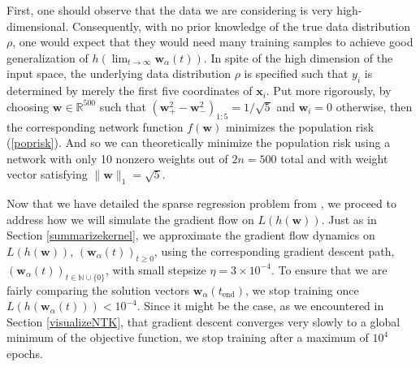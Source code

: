 \documentclass{article}
\begin{document}
First, one should observe that the data we are considering is very high-dimensional. Consequently, with no prior knowledge of the true data distribution $\rho$, one would expect that they would need many training samples to achieve good generalization of $h(\lim_{t \to \infty} \boldsymbol{w}_{\alpha}(t))$. In spite of the high dimension of the input space, the underlying data distribution $\rho$ is specified such that $y_i$ is determined by merely the first five coordinates of $\boldsymbol{x}_i$. Put more rigorously, by choosing  $\boldsymbol{w} \in \mathbb{R}^{500}$ such that $(\boldsymbol{w}_+^2 - \boldsymbol{w}_-^2)_{1:5} = 1/\sqrt{5}$ and $\boldsymbol{w}_i = 0$ otherwise, then the corresponding network function $f(\boldsymbol{w})$ minimizes the population risk (\ref{poprisk}). And so we can theoretically minimize the population risk using a network with only 10 nonzero weights out of $2n = 500$ total and with weight vector satisfying $\| \boldsymbol{w} \|_1 = \sqrt{5}$.

Now that we have detailed the sparse regression problem from \cite{woodworth2020kernel}, we proceed to address how we will simulate the gradient flow on $L(h(\boldsymbol{w}))$. Just as in Section \ref{summarizekernel}, we approximate the gradient flow dynamics on $L(h(\boldsymbol{w}))$, $(\boldsymbol{w}_{\alpha}(t))_{t \geq 0}$, using the corresponding gradient descent path, $(\boldsymbol{w}_{\alpha}(t))_{t \in \mathbb{N} \cup \{ 0\}}$, with small stepsize $\eta = 3 \times 10^{-4}$. To ensure that we are fairly comparing the solution vectors $\boldsymbol{w}_{\alpha}(t_{\text{end}})$, we stop training once $L(h(\boldsymbol{w}_{\alpha}(t))) < 10^{-4}$. Since it might be the case, as we encountered in Section \ref{visualizeNTK}, that gradient descent converges very slowly to a global minimum of the objective function, we stop training after a maximum of $10^4$ epochs. 
\end{document}

